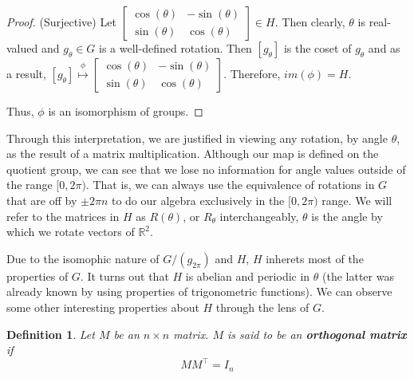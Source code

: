 \documentclass[10pt]{ucthesis}
\newcommand{\R}{\mathbb{R}}
\newtheorem{definition}{Definition}[chapter]
\begin{document}
\begin{proof}
(Surjective) Let $\begin{bmatrix}
			\cos(\theta) & -\sin(\theta) \\
			\sin(\theta) & \cos(\theta)
		\end{bmatrix}\in H$. Then clearly, $\theta$ is real-valued and $g_\theta\in G$ is a well-defined rotation. Then $[g_\theta]$ is the coset of $g_\theta$ and as a result, $[g_\theta] \overset{\phi}{\mapsto} \begin{bmatrix}
			\cos(\theta) & -\sin(\theta) \\
			\sin(\theta) & \cos(\theta)
		\end{bmatrix}$. Therefore, $im(\phi) = H$.

Thus, $\phi$ is an isomorphism of groups. \end{proof}


Through this interpretation, we are justified in viewing any rotation, by angle $\theta$, as the result of a matrix multiplication. Although our map is defined on the quotient group, we can see that we lose no information for angle values outside of the range $[0,2\pi)$. That is, we can always use the equivalence of rotations in $G$ that are off by $\pm 2\pi n$ to do our algebra exclusively in the $[0,2\pi)$ range. We will refer to the matrices in $H$ as $R(\theta)$, or $R_\theta$ interchangeably, $\theta$ is the angle by which we rotate vectors of $\R^2$. 

Due to the isomophic nature of $G/(g_{2\pi})$ and $H$, $H$ inherets most of the properties of $G$. It turns out that $H$ is abelian and periodic in $\theta$ (the latter was already known by using properties of trigonometric functions). We can observe some other interesting properties about $H$ through the lens of $G$.

\begin{definition}
	Let $M$ be an $n\times n$ matrix. $M$ is said to be an \textbf{orthogonal matrix} if $$MM^\intercal=I_n$$
\end{definition}
\end{document}
